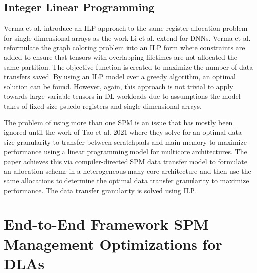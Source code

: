 \subsection{Integer Linear Programming}
Verma et al. \cite{verma} introduce an ILP approach to the same register
allocation problem for single dimensional arrays as the work Li et al. extend
for DNNs. Verma et al. reformulate the graph coloring problem into an ILP form
where constraints are added to ensure that tensors with overlapping lifetimes
are not allocated the same partition. The objective function is created to
maximize the number of data transfers saved. By using an ILP model over a
greedy algorithm, an optimal solution can be found. However, again, this
approach is not trivial to apply towards large variable tensors in DL workloads
due to assumptions the model takes of fixed size psuedo-registers and single
dimensional arrays.

The problem of using more than one SPM is an issue that has mostly been ignored
until the work of Tao et  al. 2021 where they solve for an optimal data size
granularity to transfer between scratchpads and main memory to maximize performance
using a linear programming model for multicore architectures. The paper achieves
this via compiler-directed SPM data transfer model to formulate an allocation
scheme in a heterogeneous many-core architecture and then use the same allocations
to determine the optimal data transfer granularity to maximize performance.
The data transfer granularity is solved using ILP.

\section{End-to-End Framework SPM Management Optimizations for DLAs}

